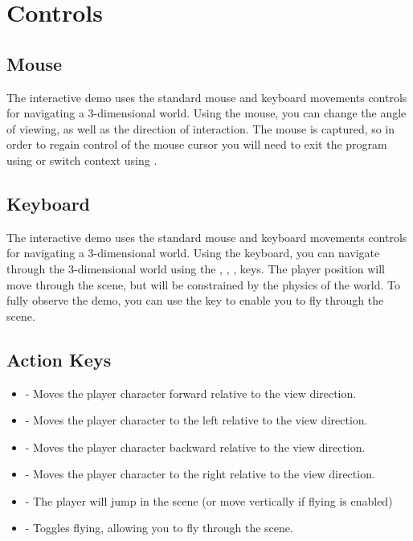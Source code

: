 \documentclass{book}
\begin{document}
\section{Controls}
\subsection{Mouse}
The interactive demo uses the standard mouse and keyboard movements controls for navigating a 3-dimensional world.  Using the mouse, you can change the angle of viewing, as well as the direction of interaction.  The mouse is captured, so in order to regain control of the mouse cursor you will need to exit the program using  or switch context using .

\subsection{Keyboard}
The interactive demo uses the standard mouse and keyboard movements controls for navigating a 3-dimensional world.   Using the keyboard, you can navigate through the 3-dimensional world using the , , ,  keys.  The player position will move through the scene, but will be constrained by the physics of the world.  To fully observe the demo, you can use the  key to enable you to fly through the scene.

\subsection{Action Keys}
\begin{itemize}
	\item {} - Moves the player character forward relative to the view direction.
	\item {} - Moves the player character to the left relative to the view direction.
	\item {} - Moves the player character backward relative to the view direction.
	\item {} - Moves the player character to the right relative to the view direction.
	\item {} - The player will jump in the scene (or move vertically if flying is enabled)
	\item {} - Toggles flying, allowing you to fly through the scene.
\end{itemize}
      
\end{document}
